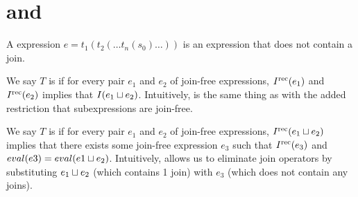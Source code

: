 \section{\dIconfluence{} and \dIreduction{}}
A  expression $e = t_1(t_2(\ldots t_n(s_0) \ldots))$ is an
expression that does not contain a join.

We say $T$ is  if for every pair $e_1$ and $e_2$ of
join-free expressions, $I^{\text{rec}}(e_1)$ and $I^{\text{rec}}(e_2)$ implies that $I(e_1 \sqcup
e_2)$. Intuitively, \dIconfluence{} is the same thing as \Iconfluence{} with
the added restriction that subexpressions are join-free.

We say $T$ is  if for every pair $e_1$ and $e_2$ of
join-free expressions, $I^{\text{rec}}(e_1 \sqcup e_2)$ implies that there exists some
join-free expression $e_3$ such that $I^{\text{rec}}(e_3)$ and $eval(e3) = eval(e1 \sqcup
e_2)$.  Intuitively, \dIreduction{} allows us to eliminate join operators by
substituting $e_1 \sqcup e_2$ (which contains 1 join) with $e_3$ (which does not
contain any joins).

% 
%

